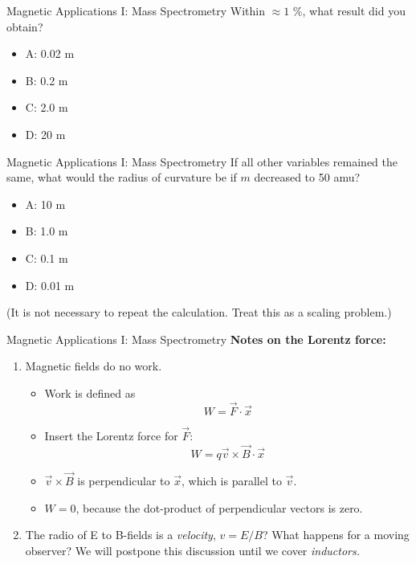 \documentclass{beamer}
\begin{document}
\begin{frame}{Magnetic Applications I: Mass Spectrometry}
Within $\approx 1$ \%, what result did you obtain?
\begin{itemize}
\item A: 0.02 m
\item B: 0.2 m
\item C: 2.0 m
\item D: 20 m
\end{itemize}
\end{frame}

\begin{frame}{Magnetic Applications I: Mass Spectrometry}
If all other variables remained the same, what would the radius of curvature be if $m$ decreased to 50 amu?
\begin{itemize}
\item A: 10 m
\item B: 1.0 m
\item C: 0.1 m
\item D: 0.01 m
\end{itemize}
\footnotesize
(It is not necessary to repeat the calculation.  Treat this as a scaling problem.)
\end{frame}

\begin{frame}{Magnetic Applications I: Mass Spectrometry}
\footnotesize
\textbf{Notes on the Lorentz force:}
\begin{enumerate}
\item Magnetic fields do no work.
\begin{itemize}
\item Work is defined as
\begin{equation}
W = \vec{F} \cdot \vec{x}
\end{equation}
\item Insert the Lorentz force for $\vec{F}$:
\begin{equation}
W = q\vec{v} \times \vec{B} \cdot \vec{x}
\end{equation}
\item $\vec{v} \times \vec{B}$ is perpendicular to $\vec{x}$, which is parallel to $\vec{v}$.
\item $W = 0$, because the dot-product of perpendicular vectors is zero.
\end{itemize}
\item The radio of E to B-fields is a \textit{velocity}, $v = E/B$?  What happens for a moving observer?  We will postpone this discussion until we cover \textit{inductors.}
\end{enumerate}
\end{frame}
\end{document}
